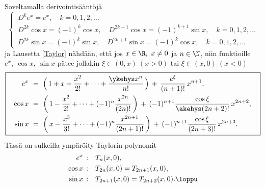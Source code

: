\begin{Exa} \label{Taylor ja exp,cos,sin} Soveltamalla derivointisääntöjä
\[ \begin{cases}
\,D^ke^x=e^x,\quad k=0,1,2,\ldots \\
\,D^{2k}\cos x=(-1)^k\cos x,\quad D^{2k+1}\cos x=(-1)^{k+1}\sin x, \quad k=0,1,2,\ldots \\
\,D^{2k}\sin x=(-1)^k\sin x,\quad D^{2k+1}\sin x=(-1)^k\cos x, \quad k=0,1,2,\ldots
\end{cases} \]
ja Lausetta \ref{Taylor} nähdään, että jos $x\in\R,\ x \neq 0$ ja $n\in\N$, niin funktioille 
$e^x,\ \cos x,\ \sin x$ pätee jollakin $\xi\in(0,x)\ (x>0)$ tai $\xi\in(x,0)\ (x<0)$ 
\newline
\[ \boxed{ \begin{aligned}
         e^x\ &=\ \Bigl(\,1+x+\frac{x^2}{2!}+\cdots +\frac{\ykehys x^n}{n!}\,\Bigr)
                             \,+\,\frac{e^\xi}{(n+1)!}\,x^{n+1}, \\
      \cos x\ &=\ \left(\,1-\frac{x^2}{2!}+\cdots +(-1)^n\frac{x^{2n}}{(2n)!}\,\right) 
                             \,+\,(-1)^{n+1}\frac{\cos\xi}{\akehys (2n+2)!}\,x^{2n+2}, \quad \\ 
\quad \sin x\ &=\ \left(\,x-\frac{x^3}{3!}+\cdots +(-1)^n\frac{x^{2n+1}}{(2n+1)!}\,\right) 
                             \,+\,(-1)^{n+1}\frac{\cos\xi}{(2n+3)!}\,x^{2n+3}. \quad
           \end{aligned} } \]
\newline
Tässä on sulkeilla ympäröity Taylorin polynomit 
\begin{align*}
e^x\,:    \quad &T_n(x,0), \\
\cos x\,: \quad &T_{2n}(x,0)=T_{2n+1}(x,0), \\
\sin x\,: \quad &T_{2n+1}(x,0)=T_{2n+2}(x,0). \loppu
\end{align*}
\end{Exa}

